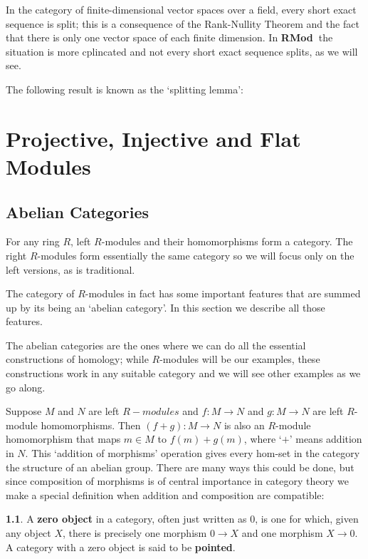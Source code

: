 \documentclass[oneside,english]{amsbook}
\numberwithin{section}{chapter}
\theoremstyle{plain}
\theoremstyle{definition}
\newtheorem{defn}[thm]{\protect\definitionname}
\providecommand{\definitionname}{Definition}
\newcommand{\catname}[1]{{\normalfont\textbf{#1}}}
\newcommand{\RMod}{\catname{RMod\ }}
\begin{document}
		In the category of finite-dimensional vector spaces over a field, every short exact sequence is split; this is a consequence of the Rank-Nullity Theorem and the fact that there is only one vector space of each finite dimension. In \RMod the situation is more cplincated and not every short exact sequence splits, as we will see.
		
		The following result is known as the `splitting lemma':
		

		
		
	\chapter{Projective, Injective and Flat Modules}

		\section{Abelian Categories}
	
			For any ring $R$, left $R$-modules and their homomorphisms form a category. The right $R$-modules form essentially the same category so we will focus only on the left versions, as is traditional.
			
			The category of $R$-modules in fact has some important features that are summed up by its being an `abelian category'. In this section we describe all those features. 
			
			The abelian categories are the ones where we can do all the essential constructions of homology; while $R$-modules will be our examples, these constructions work in any suitable category and we will see other examples as we go along.
	
			Suppose $M$ and $N$ are left $R-modules$ and $f:M\to N$ and $g:M\to N$ are left $R$-module homomorphisms. Then $(f+g):M\to N$ is also an $R$-module homomorphism that maps $m\in M$ to $f(m) + g(m)$, where `$+$' means addition in $N$. This `addition of morphisms' operation gives every hom-set in the category the structure of an abelian group. There are many ways this could be done, but since composition of morphisms is of central importance in category theory we make a special definition when addition and composition are compatible:

			\begin{defn}
				A \textbf{zero object} in a category, often just written as $0$, is one for which, given any object $X$, there is precisely one morphism $0\to X$ and one morphism $X\to 0$. A category with a zero object is said to be \textbf{pointed}.
			\end{defn}
			
\end{document}
